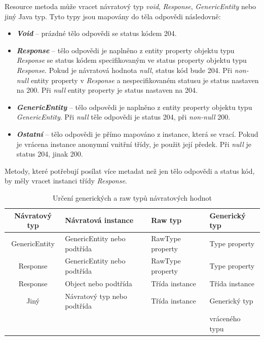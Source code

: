 \documentclass[11pt,twoside,a4paper]{book}
\begin{document}
Resource metoda může vracet návratový typ {\em void}, {\em Response},
{\em GenericEntity} nebo jiný Java typ. Tyto typy jsou mapovány do těla odpovědi
následovně:

\begin{itemize}
  \item \textbf{\textit{Void}} – prázdné tělo odpovědi se status kódem 204.
  \item \textbf{\textit{Response}} – tělo odpovědi je naplněno z entity
  property objektu typu {\em Response} se status kódem specifikovaným ve status property objektu typu {\em Response}. Pokud je
návratová hodnota {\em null}, status kód bude 204. Při {\em non-null} entity
property v {\em Response} a nespecifikovaném statusu je status nastaven na 200.
Při {\em null} entity property je status nastaven na 204.
  \item \textbf{\textit{GenericEntity}} – tělo odpovědi je naplněno
  z entity property objektu typu {\em GenericEntity}. Při {\em null} těle
  odpovědi je status 204, při {\em non-null} 200.
  \item \textbf{\textit{Ostatní}} – tělo odpovědi je přímo mapováno z
  instance, která se vrací.
Pokud je vrácena instance anonymní vnitřní třídy, je použit její předek. Při
{\em null} je status 204, jinak 200.
\end{itemize}

Metody, které potřebují posílat více metadat než jen tělo odpovědi a status kód, by měly
vracet instanci třídy {\em Response}.

\begin{table}
\begin{center}
\begin{tabular}{|c|l|l|l|}
\hline
\textbf{Návratový typ} & \textbf{Návratová instance} & \textbf{Raw typ} &
\textbf{Generický typ} \\
\hline
GenericEntity & GenericEntity nebo podtřída & RawType property & Type property \\
\hline
Response & GenericEntity nebo podtřída & RawType property & Type property \\
\hline
Response & Object nebo podtřída  & Třída instance & Třída instance \\
\hline
Jiný & Návratový typ nebo podtřída  & Třída instance & Generický typ \\
&&&  vráceného typu \\
\hline
\end{tabular}
\end{center}
\caption{Určení generických a raw typů návratových hodnot}
\label{tab:genericke-a-raw-typy}
\end{table}
\end{document}
